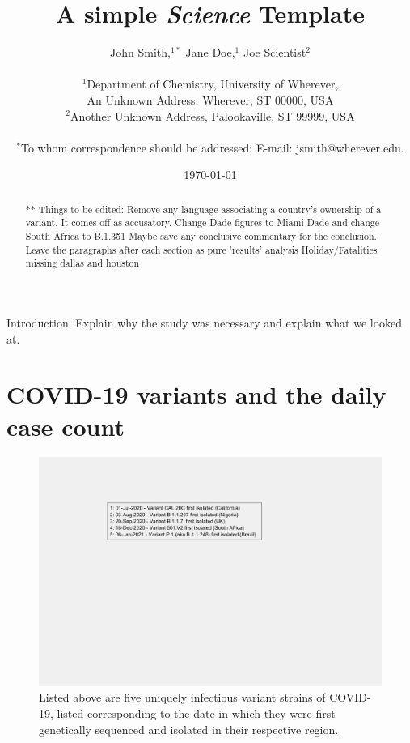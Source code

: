 \documentclass[]{article}
\title{A simple {\it Science\/} Template}
\author
{John Smith,$^{1\ast}$ Jane Doe,$^{1}$ Joe Scientist$^{2}$\\
	\\
	\normalsize{$^{1}$Department of Chemistry, University of Wherever,}\\
	\normalsize{An Unknown Address, Wherever, ST 00000, USA}\\
	\normalsize{$^{2}$Another Unknown Address, Palookaville, ST 99999, USA}\\
	\\
	\normalsize{$^\ast$To whom correspondence should be addressed; E-mail:  jsmith@wherever.edu.}
}
\date{\today}
\begin{document}
	
\baselineskip24pt

\maketitle

\begin{abstract}
 ** Things to be edited:
 Remove any language associating a country's ownership of a variant. It comes off as accusatory. 
 Change Dade figures to Miami-Dade and change South Africa to B.1.351
  Maybe save any conclusive commentary for the conclusion. Leave the paragraphs after each section as pure 'results' analysis
  Holiday/Fatalities missing dallas and houston
 
\end{abstract}

\indent Introduction. Explain why the study was necessary and explain what we looked at. 

\section*{COVID-19 variants and the daily case count}


\begin{figure}[!h]
	\includegraphics[width=\linewidth]{legends/variant_strains_legend.png}
	\caption{Listed above are five uniquely infectious variant strains of COVID-19,  listed corresponding to the date in which they were first genetically sequenced and isolated in their respective region.   }
	\label{fig:legends/variant_strains_legendLabel}
\end{figure}
\end{document}
